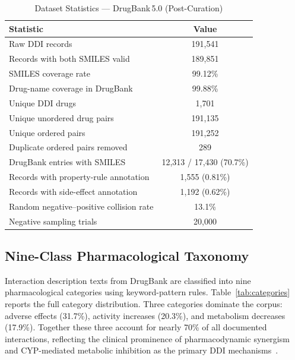 \documentclass[conference]{IEEEtran}
\begin{document}
\begin{table}[t]
\centering
\caption{Dataset Statistics — DrugBank\,5.0 (Post-Curation)}
\label{tab:dataset}
\begin{tabular}{lc}
\toprule
\textbf{Statistic} & \textbf{Value} \\
\midrule
Raw DDI records                           & 191,541 \\
Records with both SMILES valid            & 189,851 \\
SMILES coverage rate                      & 99.12\%  \\
Drug-name coverage in DrugBank            & 99.88\%  \\
Unique DDI drugs                          & 1,701    \\
Unique unordered drug pairs               & 191,135  \\
Unique ordered pairs                      & 191,252  \\
Duplicate ordered pairs removed           & 289      \\
DrugBank entries with SMILES              & 12,313 / 17,430 (70.7\%) \\
Records with property-rule annotation     & 1,555 (0.81\%) \\
Records with side-effect annotation       & 1,192 (0.62\%) \\
Random negative--positive collision rate  & 13.1\%   \\
Negative sampling trials                  & 20,000   \\
\bottomrule
\end{tabular}
\end{table}

\subsection{Nine-Class Pharmacological Taxonomy}

Interaction description texts from DrugBank are classified into nine pharmacological
categories using keyword-pattern rules. Table~\ref{tab:categories} reports the full
category distribution. Three categories dominate the corpus: adverse effects (31.7\%),
activity increases (20.3\%), and metabolism decreases (17.9\%). Together these three
account for nearly 70\% of all documented interactions, reflecting the clinical prominence
of pharmacodynamic synergism and CYP-mediated metabolic inhibition as the primary DDI
mechanisms~\cite{becker2007ddi}.
\end{document}
